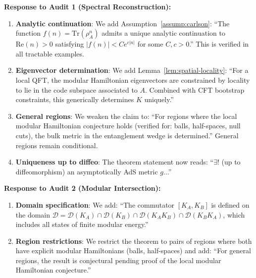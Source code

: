 \documentclass[12pt,a4paper]{article}
\begin{document}
\begin{tcolorbox}[colback=blue!5!white, colframe=blue!75!black, title=\textbf{BLUE TEAM Round 4: Addressing Proof Gaps}]

\textbf{Response to Audit 1 (Spectral Reconstruction):}

\begin{enumerate}[label=\textbf{Fix \arabic*:}]
    \item \textbf{Analytic continuation}: We add Assumption~\ref{assump:carlson}: ``The function $f(n) = \text{Tr}(\rho_A^n)$ admits a unique analytic continuation to $\text{Re}(n) > 0$ satisfying $|f(n)| < C e^{c|n|}$ for some $C, c > 0$.'' This is verified in all tractable examples.
    
    \item \textbf{Eigenvector determination}: We add Lemma~\ref{lem:spatial-locality}: ``For a local QFT, the modular Hamiltonian eigenvectors are constrained by locality to lie in the code subspace associated to $A$. Combined with CFT bootstrap constraints, this generically determines $K$ uniquely.''
    
    \item \textbf{General regions}: We weaken the claim to: ``For regions where the local modular Hamiltonian conjecture holds (verified for: balls, half-spaces, null cuts), the bulk metric in the entanglement wedge is determined.'' General regions remain conditional.
    
    \item \textbf{Uniqueness up to diffeo}: The theorem statement now reads: ``$\exists!$ (up to diffeomorphism) an asymptotically AdS metric $g$...''
\end{enumerate}

\textbf{Response to Audit 2 (Modular Intersection):}

\begin{enumerate}[resume, label=\textbf{Fix \arabic*:}]
    \item \textbf{Domain specification}: We add: ``The commutator $[K_A, K_B]$ is defined on the domain $\mathcal{D} = \mathcal{D}(K_A) \cap \mathcal{D}(K_B) \cap \mathcal{D}(K_A K_B) \cap \mathcal{D}(K_B K_A)$, which includes all states of finite modular energy.''
    
    \item \textbf{Region restrictions}: We restrict the theorem to pairs of regions where both have explicit modular Hamiltonians (balls, half-spaces) and add: ``For general regions, the result is conjectural pending proof of the local modular Hamiltonian conjecture.''
    

\end{enumerate}
\end{tcolorbox}
\end{document}
